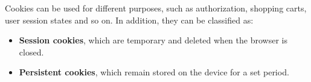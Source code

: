 \noindent Cookies can be used for different purposes, such as authorization, shopping carts, user session states and so on. In addition, they can be classified as:
\begin{itemize}
    \item \textbf{Session cookies}, which are temporary and deleted when the browser is closed.
    \item \textbf{Persistent cookies}, which remain stored on the device for a set period.
\end{itemize}